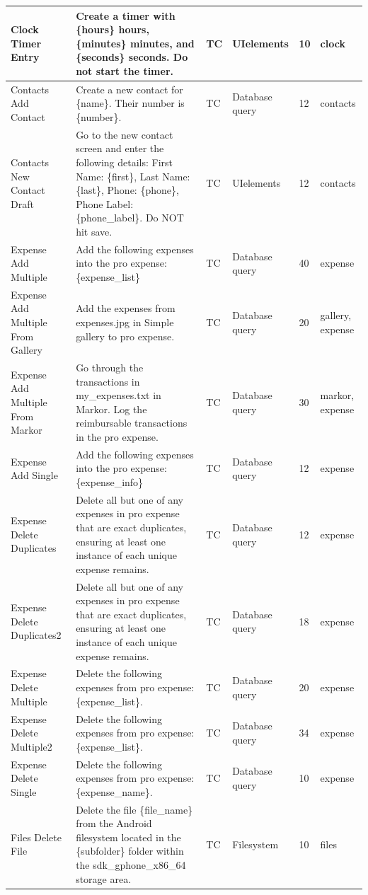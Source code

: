 \documentclass{article}
\begin{document}
\begin{appendices}
\begin{longtable}{>{\RaggedRight\seqsplit}p{.8in}p{2in}p{.3in}p{.5in}p{.3in}p{.5in}}
\midrule
Clock Timer Entry & Create a timer with \{hours\} hours, \{minutes\} minutes, and \{seconds\} seconds. Do not start the timer. & TC & UI\-elements & 10 & clock \\
\midrule
Contacts Add Contact & Create a new contact for \{name\}. Their number is \{number\}. & TC & Database query & 12 & contacts \\
\midrule
Contacts New Contact Draft & Go to the new contact screen and enter the following details: First Name: \{first\}, Last Name: \{last\}, Phone: \{phone\}, Phone Label: \{phone\_label\}. Do NOT hit save. & TC & UI\-elements & 12 & contacts \\
\midrule
Expense Add Multiple & Add the following expenses into the pro expense: \{expense\_list\} & TC & Database query & 40 & expense \\
\midrule
Expense Add Multiple From Gallery & Add the expenses from expenses.jpg in Simple gallery to pro expense. & TC & Database query & 20 & gallery, expense \\
\midrule
Expense Add Multiple From Markor & Go through the transactions in my\_expenses.txt in Markor. Log the reimbursable transactions in the pro expense. & TC & Database query & 30 & markor, expense \\
\midrule
Expense Add Single & Add the following expenses into the pro expense: \{expense\_info\} & TC & Database query & 12 & expense \\
\midrule
Expense Delete Duplicates & Delete all but one of any expenses in pro expense that are exact duplicates, ensuring at least one instance of each unique expense remains. & TC & Database query & 12 & expense \\
\midrule
Expense Delete Duplicates2 & Delete all but one of any expenses in pro expense that are exact duplicates, ensuring at least one instance of each unique expense remains. & TC & Database query & 18 & expense \\
\midrule
Expense Delete Multiple & Delete the following expenses from pro expense: \{expense\_list\}. & TC & Database query & 20 & expense \\
\midrule
Expense Delete Multiple2 & Delete the following expenses from pro expense: \{expense\_list\}. & TC & Database query & 34 & expense \\
\midrule
Expense Delete Single & Delete the following expenses from pro expense: \{expense\_name\}. & TC & Database query & 10 & expense \\
\midrule
Files Delete File & Delete the file \{file\_name\} from the Android filesystem located in the \{subfolder\} folder within the sdk\_gphone\_x86\_64 storage area. & TC & Filesystem & 10 & files \\

\end{longtable}
\end{appendices}
\end{document}
